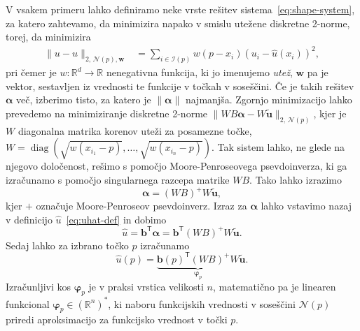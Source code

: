 \documentclass[12pt,a4paper,twoside]{article}
\theoremstyle{definition} %
\theoremstyle{plain} %
\numberwithin{equation}{section}
\newcommand{\R}{\mathbb R}
\newcommand{\Nc}{\mathcal{N}}
\newcommand{\I}{\mathcal{I}}
\newcommand{\T}{\mathsf{T}}
\renewcommand{\b}{\boldsymbol}
\renewcommand{\phi}{\varphi}
\newcommand{\uh}{\hat{u}}
\DeclareMathOperator{\diag}{diag}
\begin{document}
V vsakem primeru lahko definiramo neke vrste rešitev sistema~\eqref{eq:shape-system},
za katero zahtevamo, da minimizira napako v smislu utežene diskretne 2-norme, torej, da minimizira
\begin{align}
  \|u-\uh\|_{2, \,\Nc(p), \b{w}} &= \sum_{i\in \I(p)} w(p-x_i) (u_i - \uh(x_i))^2,
\end{align}
pri čemer je $w\colon\R^d\to\R$ nenegativna funkcija, ki jo imenujemo \emph{utež}, $\b{w}$ pa je
vektor, sestavljen iz vrednosti te funkcije v točkah v soseščini. Če je takih rešitev $\b \alpha$ več,
izberimo tisto, za katero je $\|\b\alpha\|$ najmanjša. Zgornjo minimizacijo lahko prevedemo na
minimiziranje diskretne 2-norme $\|WB\b{\alpha}-W\b{\tilde{u}}\|_{2, \,\Nc(p)}$, kjer je $W$ diagonalna
matrika korenov uteži za posamezne točke, $W = \diag(\sqrt{w(x_{i_1}-p)}, \dots,
\sqrt{w(x_{i_n}-p)})$. Tak sistem lahko, ne glede na njegovo določenost, rešimo s pomočjo
Moore-Penroseovega psevdoinverza, ki ga izračunamo s pomočjo singularnega razcepa matrike $WB$.
Tako lahko izrazimo
\begin{equation}
   \b{\alpha} = (WB)^{+}W\b{\tilde u},
\end{equation}
kjer $+$ označuje Moore-Penroseov psevdoinverz. Izraz za $\b\alpha$ lahko vstavimo nazaj v definicijo
$\hat{u}$~\eqref{eq:uhat-def} in dobimo
\begin{equation}
  \hat{u} = \b{b}^\T\b{\alpha} = \b{b}^\T(WB)^{+}W\b{\tilde{u}}.
\end{equation}
Sedaj lahko za izbrano točko $p$ izračunamo
\begin{equation}
   \hat{u}(p) = \underbrace{\b{b}(p)^\T(WB)^{+}W}_{\b\phi_p}\b{\tilde{u}}.
\end{equation}
Izračunljivi kos $\b\phi_p$ je v praksi vrstica velikosti $n$, matematično pa je
linearen funkcional $\b\phi_p \in (\R^n)^\ast$, ki naboru funkcijskih vrednosti v
soseščini $\Nc(p)$ priredi aproksimacijo za funkcijsko vrednost v točki $p$.
\end{document}
